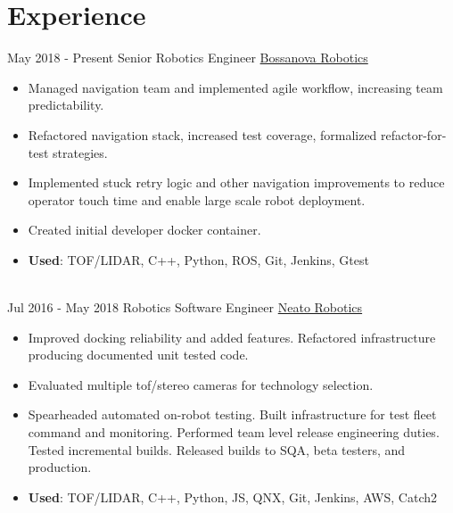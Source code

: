 \documentclass[letterpaper]{twentysecondcv} %
\begin{document}
\makeprofile %


\section{Experience}

\begin{twenty} %
\twentyitem
    	{May 2018 -}
		{Present}
        {Senior Robotics Engineer}
        {\href{http://www.bossanova.com/}{Bossanova Robotics}}
        {}
        {\begin{itemize}
          \item Managed navigation team and implemented agile workflow, increasing team predictability.
          \item Refactored navigation stack, increased test coverage, formalized refactor-for-test strategies.
          \item Implemented stuck retry logic and other navigation improvements to
                reduce operator touch time and enable large scale robot deployment.
          \item Created initial developer docker container.
          \item \textbf{Used}: TOF/LIDAR, C++, Python, ROS, Git, Jenkins, Gtest
        \end{itemize}}
        \\
	\twentyitem
    	{Jul 2016 -}
		{May 2018}
        {Robotics Software Engineer}
        {\href{http://www.neatorobotics.com/}{Neato Robotics}}
        {}
        {
        {\begin{itemize}
        \item Improved docking reliability and added features.
              Refactored infrastructure producing documented unit tested code.
        \item Evaluated multiple tof/stereo cameras for technology selection.
        \item Spearheaded automated on-robot testing.
              Built infrastructure for test fleet command and monitoring.
              Performed team level release engineering duties.
              Tested incremental builds.
              Released builds to SQA, beta testers, and production.
        \item \textbf{Used}: TOF/LIDAR, C++, Python, JS, QNX, Git, Jenkins, AWS, Catch2

\end{itemize}}}
\end{twenty}
\end{document}
